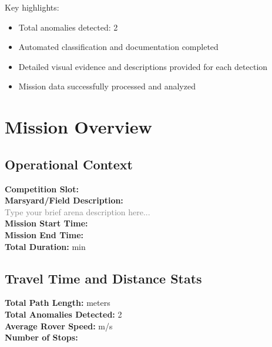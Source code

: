 \documentclass[12pt,a4paper]{report}
\begin{document}
Key highlights:
\begin{itemize}
\item Total anomalies detected: 2
\item Automated classification and documentation completed
\item Detailed visual evidence and descriptions provided for each detection
\item Mission data successfully processed and analyzed
\end{itemize}


\chapter{Mission Overview}
\section{Operational Context}
\vspace{0.5em}
\noindent \textbf{Competition Slot:} \underline{\hspace{4cm}}\\[0.5em]
\noindent \textbf{Marsyard/Field Description:} \\
\textcolor{gray}{Type your brief arena description here...} \\[0.8em]
\noindent \textbf{Mission Start Time:} \underline{\hspace{3cm}}\\[0.5em]
\noindent \textbf{Mission End Time:} \underline{\hspace{3cm}}\\[0.5em]
\noindent \textbf{Total Duration:} \underline{\hspace{2.5cm}} min

\section{Travel Time and Distance Stats}
\vspace{0.5em}
\noindent \textbf{Total Path Length:} \underline{\hspace{2.5cm}} meters\\[0.5em]
\noindent \textbf{Total Anomalies Detected:} 2\\[0.5em]
\noindent \textbf{Average Rover Speed:} \underline{\hspace{2.5cm}} m/s\\[0.5em]
\noindent \textbf{Number of Stops:} \underline{\hspace{2cm}}
\end{document}
